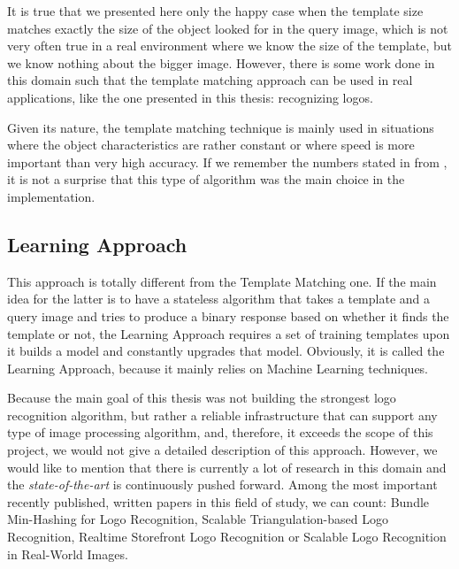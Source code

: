 It is true that we presented here only the happy case when the template size
matches exactly the size of the object looked for in the query image, which is
not very often true in a real environment where we know the size of the
template, but we know nothing about the bigger image. However, there is some
work done in this domain \cite{fast-ccorr} \cite{phase-angle} such that the
template matching approach can be used in real applications, like the one
presented in this thesis: recognizing logos.

Given its nature, the template matching technique is mainly used in situations
where the object characteristics are rather constant or where speed is more
important than very high accuracy. If we remember the numbers stated in
 from ,
it is not a surprise that this type of algorithm was the main choice in the implementation.

\subsection{Learning Approach}
This approach is totally different from the Template Matching one. If the main
idea for the latter is to have a stateless algorithm that takes a template and
a query image and tries to produce a binary response based on whether it finds
the template or not, the Learning Approach requires a set of training
templates upon it builds a model and constantly upgrades that model.
Obviously, it is called the Learning Approach, because it mainly relies on
Machine Learning techniques.

Because the main goal of this thesis was not building the strongest logo
recognition algorithm, but rather a reliable infrastructure that can support any
type of image processing algorithm, and, therefore, it exceeds the scope of
this project, we would not give a detailed description of this approach.
However, we would like to mention that there is currently a lot of research in
this domain and the \textit{state-of-the-art} is continuously pushed forward.
Among the most important recently published, written papers in this field of study, we can count:
Bundle Min-Hashing for Logo Recognition\cite{bundle}, Scalable Triangulation-based Logo
Recognition\cite{triang}, Realtime Storefront Logo
Recognition\cite{storefront} or Scalable Logo Recognition
in Real-World Images\cite{real-world}.

